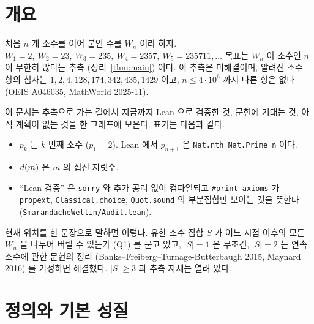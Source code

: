 
\chapter{개요}

처음 \(n\) 개 소수를 이어 붙인 수를 \(W_n\) 이라 하자.
\(W_1 = 2,\ W_2 = 23,\ W_3 = 235,\ W_4 = 2357,\ W_5 = 235711, \dots\)
목표는 \(W_n\) 이 소수인 \(n\) 이 무한히 많다는 추측 (정리~\ref{thm:main}) 이다.
이 추측은 미해결이며, 알려진 소수 항의 첨자는 \(1, 2, 4, 128, 174, 342, 435, 1429\) 이고, \(n \le 4 \cdot 10^6\) 까지 다른 항은 없다
(OEIS A046035, MathWorld 2025-11).

이 문서는 추측으로 가는 길에서 지금까지 Lean 으로 검증한 것, 문헌에 기대는 것,
아직 계획이 없는 것을 한 그래프에 모은다. 표기는 다음과 같다.
\begin{itemize}
  \item \(p_k\) 는 \(k\) 번째 소수 (\(p_1 = 2\)). Lean 에서 \(p_{n+1}\) 은 \texttt{Nat.nth Nat.Prime n} 이다.
  \item \(d(m)\) 은 \(m\) 의 십진 자릿수.
  \item ``Lean 검증'' 은 \texttt{sorry} 와 추가 공리 없이 컴파일되고 \texttt{\#print axioms} 가
        \texttt{propext}, \texttt{Classical.choice}, \texttt{Quot.sound} 의 부분집합만 보이는 것을 뜻한다
        (\texttt{SmarandacheWellin/Audit.lean}).
\end{itemize}

현재 위치를 한 문장으로 말하면 이렇다. 유한 소수 집합 \(S\) 가 어느 시점 이후의 모든 \(W_n\) 을
나누어 버릴 수 있는가 (Q1) 를 묻고 있고, \(|S| = 1\) 은 무조건, \(|S| = 2\) 는 연속 소수에 관한
문헌의 정리 (Banks--Freiberg--Turnage-Butterbaugh 2015, Maynard 2016) 를 가정하면 해결했다.
\(|S| \ge 3\) 과 추측 자체는 열려 있다.

\chapter{정의와 기본 성질}

